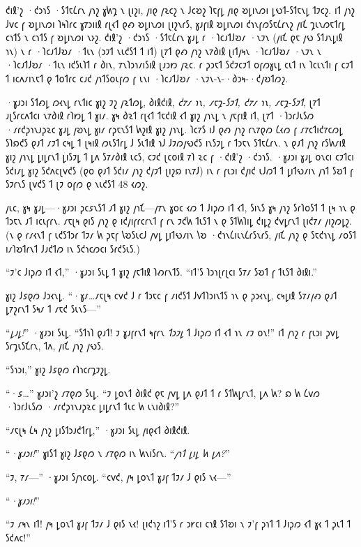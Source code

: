 𐑒𐑦𐑙'𐑟 ·𐑒𐑮𐑪𐑕 ·𐑕𐑑𐑱𐑖𐑩𐑯 𐑢𐑪𐑟 𐑣𐑿𐑡 𐑯 𐑚𐑦𐑟𐑦, 𐑢𐑦𐑞 𐑢𐑷𐑤𐑟 𐑯 𐑓𐑤𐑹𐑟 𐑐𐑱𐑝𐑛 𐑢𐑦𐑞 𐑹𐑛𐑦𐑯𐑼𐑦 𐑛𐑻𐑑-𐑕𐑑𐑱𐑯𐑛 𐑑𐑲𐑤𐑟. 𐑦𐑑 𐑢𐑪𐑟 𐑓𐑫𐑤 𐑝 𐑹𐑛𐑦𐑯𐑼𐑦 𐑐𐑰𐑐𐑩𐑤 𐑣𐑳𐑮𐑦𐑦𐑙 𐑩𐑚𐑬𐑑 𐑞𐑺 𐑹𐑛𐑦𐑯𐑼𐑦 𐑚𐑦𐑟𐑯𐑩𐑕, 𐑣𐑨𐑝𐑦𐑙 𐑹𐑛𐑦𐑯𐑼𐑦 𐑒𐑪𐑯𐑝𐑼𐑕𐑱𐑖𐑩𐑯𐑟 𐑢𐑦𐑗 𐑡𐑧𐑯𐑼𐑱𐑑𐑩𐑛 𐑤𐑪𐑑𐑕 𐑯 𐑤𐑪𐑑𐑕 𐑝 𐑹𐑛𐑦𐑯𐑼𐑦 𐑯𐑶𐑟. 𐑒𐑦𐑙'𐑟 ·𐑒𐑮𐑪𐑕 ·𐑕𐑑𐑱𐑖𐑩𐑯 𐑣𐑨𐑛 𐑩 ·𐑐𐑤𐑨𐑑𐑓𐑹𐑥 ·𐑯𐑲𐑯 (𐑢𐑦𐑗 𐑞𐑱 𐑢𐑻 𐑕𐑑𐑨𐑯𐑛𐑦𐑙 𐑪𐑯) 𐑯 𐑩 ·𐑐𐑤𐑨𐑑𐑓𐑹𐑥 ·𐑑𐑧𐑯 (𐑮𐑲𐑑 𐑯𐑧𐑒𐑕𐑑 𐑑 𐑦𐑑) 𐑚𐑳𐑑 𐑞𐑺 𐑢𐑪𐑟 𐑯𐑳𐑔𐑦𐑙 𐑚𐑦𐑑𐑢𐑰𐑯 ·𐑐𐑤𐑨𐑑𐑓𐑹𐑥 ·𐑯𐑲𐑯 𐑯 ·𐑐𐑤𐑨𐑑𐑓𐑹𐑥 ·𐑑𐑧𐑯 𐑦𐑒𐑕𐑧𐑐𐑑 𐑩 𐑔𐑦𐑯, 𐑳𐑯𐑐𐑮𐑪𐑥𐑦𐑕𐑦𐑙 𐑚𐑨𐑮𐑽 𐑢𐑷𐑤. 𐑩 𐑜𐑮𐑱𐑑 𐑕𐑒𐑲𐑤𐑲𐑑 𐑴𐑝𐑼𐑣𐑧𐑛 𐑤𐑧𐑑 𐑦𐑯 𐑐𐑤𐑧𐑯𐑑𐑦 𐑝 𐑤𐑲𐑑 𐑑 𐑦𐑤𐑵𐑥𐑦𐑯𐑱𐑑 𐑞 𐑑𐑴𐑑𐑩𐑤 𐑤𐑨𐑒 𐑢𐑪𐑑𐑕𐑴𐑧𐑝𐑼 𐑝 𐑧𐑯𐑦 ·𐑐𐑤𐑨𐑑𐑓𐑹𐑥 ·𐑯𐑲𐑯-𐑯-·𐑔𐑮𐑰-·𐑒𐑢𐑹𐑑𐑼𐑟.

·𐑣𐑨𐑮𐑦 𐑕𐑑𐑺𐑛 𐑼𐑬𐑯𐑛 𐑩𐑯𐑑𐑦𐑤 𐑣𐑦𐑟 𐑲𐑟 𐑢𐑷𐑑𐑼𐑛, 𐑔𐑦𐑙𐑒𐑦𐑙, \emph{𐑒𐑳𐑥 𐑪𐑯, 𐑥𐑱𐑡-𐑕𐑲𐑑, 𐑒𐑳𐑥 𐑪𐑯, 𐑥𐑱𐑡-𐑕𐑲𐑑}, 𐑚𐑳𐑑 𐑨𐑚𐑕𐑩𐑤𐑵𐑑𐑤𐑦 𐑯𐑳𐑔𐑦𐑙 𐑩𐑐𐑽𐑛 𐑑 𐑣𐑦𐑥. 𐑣𐑰 𐑔𐑷𐑑 𐑩𐑚𐑬𐑑 𐑑𐑱𐑒𐑦𐑙 𐑬𐑑 𐑣𐑦𐑟 𐑢𐑪𐑯𐑛 𐑯 𐑢𐑱𐑝𐑦𐑙 𐑦𐑑, 𐑚𐑳𐑑 ·𐑐𐑮𐑩𐑓𐑧𐑕𐑼 ·𐑥𐑩𐑒𐑜𐑪𐑯𐑨𐑜𐑷𐑤 𐑣𐑨𐑛 𐑢𐑹𐑯𐑛 𐑣𐑦𐑥 𐑩𐑜𐑱𐑯𐑕𐑑 𐑿𐑟𐑦𐑙 𐑣𐑦𐑟 𐑢𐑪𐑯𐑛. 𐑐𐑤𐑳𐑕 𐑦𐑓 𐑞𐑺 𐑢𐑪𐑟 𐑩𐑯𐑳𐑞𐑼 𐑖𐑬𐑼 𐑝 𐑥𐑳𐑤𐑑𐑦𐑒𐑳𐑤𐑼𐑛 𐑕𐑐𐑸𐑒𐑕 𐑞𐑨𐑑 𐑥𐑲𐑑 𐑤𐑰𐑛 𐑑 𐑚𐑰𐑦𐑙 𐑼𐑧𐑕𐑑𐑩𐑛 𐑓 𐑕𐑧𐑑𐑦𐑙 𐑪𐑓 𐑓𐑲𐑼𐑢𐑻𐑒𐑕 𐑦𐑯𐑕𐑲𐑛 𐑩 𐑑𐑮𐑱𐑯 𐑕𐑑𐑱𐑖𐑩𐑯. 𐑯 𐑞𐑨𐑑 𐑢𐑪𐑟 𐑩𐑕𐑿𐑥𐑦𐑙 𐑣𐑦𐑟 𐑢𐑪𐑯𐑛 𐑛𐑦𐑛𐑩𐑯𐑑 𐑛𐑦𐑕𐑲𐑛 𐑑 𐑛𐑵 𐑕𐑳𐑥𐑔𐑦𐑙 𐑧𐑤𐑕, 𐑤𐑲𐑒 𐑚𐑤𐑴𐑦𐑙 𐑳𐑐 𐑷𐑤 𐑝 ·𐑒𐑦𐑙'𐑟 ·𐑒𐑮𐑪𐑕. ·𐑣𐑨𐑮𐑦 𐑣𐑨𐑛 𐑴𐑯𐑤𐑦 𐑤𐑲𐑑𐑤𐑦 𐑕𐑒𐑦𐑥𐑛 𐑣𐑦𐑟 𐑕𐑒𐑵𐑤𐑚𐑫𐑒𐑕 (𐑞𐑴 𐑞𐑨𐑑 𐑕𐑒𐑦𐑥 𐑢𐑪𐑟 𐑒𐑢𐑲𐑑 𐑚𐑦𐑟𐑸 𐑦𐑯𐑳𐑓) 𐑦𐑯 𐑩 𐑝𐑧𐑮𐑦 𐑒𐑢𐑦𐑒 𐑧𐑓𐑼𐑑 𐑑 𐑛𐑦𐑑𐑻𐑥𐑦𐑯 𐑢𐑪𐑑 𐑕𐑹𐑑 𐑝 𐑕𐑲𐑩𐑯𐑕 𐑚𐑫𐑒𐑕 𐑑 𐑚𐑲 𐑴𐑝𐑼 𐑞 𐑯𐑧𐑒𐑕𐑑 48 𐑬𐑼𐑟.

𐑢𐑧𐑤, 𐑣𐑰 𐑣𐑨𐑛—·𐑣𐑨𐑮𐑦 𐑜𐑤𐑭𐑯𐑕𐑑 𐑨𐑑 𐑣𐑦𐑟 𐑢𐑪𐑗—𐑢𐑳𐑯 𐑣𐑴𐑤 𐑬𐑼 𐑑 𐑓𐑦𐑜𐑼 𐑦𐑑 𐑬𐑑, 𐑕𐑦𐑯𐑕 𐑣𐑰 𐑢𐑪𐑟 𐑕𐑩𐑐𐑴𐑕𐑑 𐑑 𐑚𐑰 𐑪𐑯 𐑞 𐑑𐑮𐑱𐑯 𐑨𐑑 𐑦𐑤𐑧𐑝𐑩𐑯. 𐑥𐑱𐑚𐑰 𐑞𐑦𐑕 𐑢𐑪𐑟 𐑞 𐑦𐑒𐑢𐑦𐑝𐑩𐑤𐑩𐑯𐑑 𐑝 𐑩𐑯 𐑲𐑒𐑿 𐑑𐑧𐑕𐑑 𐑯 𐑞 𐑕𐑑𐑿𐑐𐑦𐑛 𐑒𐑦𐑛𐑟 𐑒𐑫𐑛𐑩𐑯𐑑 𐑚𐑦𐑒𐑳𐑥 𐑢𐑦𐑟𐑼𐑛𐑟. (𐑯 𐑞 𐑩𐑥𐑬𐑯𐑑 𐑝 𐑧𐑒𐑕𐑑𐑮𐑩 𐑑𐑲𐑥 𐑿 𐑜𐑱𐑝 𐑘𐑹𐑕𐑧𐑤𐑓 𐑢𐑫𐑛 𐑛𐑦𐑑𐑻𐑥𐑦𐑯 𐑘𐑹 ·𐑒𐑪𐑯𐑖𐑦𐑧𐑯𐑖𐑩𐑕𐑯𐑩𐑕, 𐑢𐑦𐑗 𐑢𐑪𐑟 𐑞 𐑕𐑱𐑒𐑪𐑯𐑛 𐑥𐑴𐑕𐑑 𐑦𐑥𐑐𐑹𐑑𐑩𐑯𐑑 𐑓𐑨𐑒𐑑𐑼 𐑦𐑯 𐑕𐑒𐑪𐑤𐑼𐑤𐑦 𐑕𐑩𐑒𐑕𐑧𐑕.)

“𐑲'𐑤 𐑓𐑦𐑜𐑼 𐑦𐑑 𐑬𐑑,” ·𐑣𐑨𐑮𐑦 𐑕𐑧𐑛 𐑑 𐑣𐑦𐑟 𐑢𐑱𐑑𐑦𐑙 𐑐𐑺𐑩𐑯𐑑𐑕. “𐑦𐑑'𐑕 𐑐𐑮𐑪𐑚𐑩𐑚𐑤𐑦 𐑕𐑳𐑥 𐑕𐑹𐑑 𐑝 𐑑𐑧𐑕𐑑 𐑔𐑦𐑙𐑦.”

𐑣𐑦𐑟 𐑓𐑭𐑞𐑼 𐑓𐑮𐑬𐑯𐑛. “·𐑣𐑥…𐑥𐑱𐑚𐑰 𐑤𐑫𐑒 𐑓 𐑩 𐑑𐑮𐑱𐑤 𐑝 𐑥𐑦𐑒𐑕𐑑 𐑓𐑫𐑑𐑐𐑮𐑦𐑯𐑑𐑕 𐑪𐑯 𐑞 𐑜𐑮𐑬𐑯𐑛, 𐑤𐑰𐑛𐑦𐑙 𐑕𐑳𐑥𐑢𐑺 𐑞𐑨𐑑 𐑛𐑳𐑟𐑩𐑯𐑑 𐑕𐑰𐑥 𐑑 𐑥𐑱𐑒 𐑕𐑧𐑯𐑕—”

“\emph{𐑛𐑨𐑛!}” ·𐑣𐑨𐑮𐑦 𐑕𐑧𐑛. “𐑕𐑑𐑪𐑐 𐑞𐑨𐑑! 𐑲 𐑣𐑨𐑝𐑩𐑯𐑑 𐑰𐑝𐑩𐑯 \emph{𐑑𐑮𐑲𐑛} 𐑑 𐑓𐑦𐑜𐑼 𐑦𐑑 𐑬𐑑 𐑪𐑯 𐑥𐑲 𐑴𐑯!” 𐑦𐑑 𐑢𐑪𐑟 𐑩 𐑝𐑧𐑮𐑦 𐑜𐑫𐑛 𐑕𐑩𐑡𐑧𐑕𐑗𐑩𐑯, 𐑑𐑵, 𐑢𐑦𐑗 𐑢𐑪𐑟 𐑢𐑻𐑕.

“𐑕𐑪𐑮𐑦,” 𐑣𐑦𐑟 𐑓𐑭𐑞𐑼 𐑩𐑐𐑪𐑤𐑩𐑡𐑲𐑟𐑛.

“·𐑭…” 𐑣𐑨𐑮𐑦'𐑟 𐑥𐑳𐑞𐑼 𐑕𐑧𐑛. “𐑲 𐑛𐑴𐑯𐑑 𐑔𐑦𐑙𐑒 𐑞𐑱 𐑢𐑫𐑛 𐑛𐑵 𐑞𐑨𐑑 𐑑 𐑩 𐑕𐑑𐑿𐑛𐑩𐑯𐑑, 𐑛𐑵 𐑿? 𐑸 𐑿 𐑖𐑫𐑼 ·𐑐𐑮𐑩𐑓𐑧𐑕𐑼 ·𐑥𐑩𐑒𐑜𐑪𐑯𐑨𐑜𐑷𐑤 𐑛𐑦𐑛𐑩𐑯𐑑 𐑑𐑧𐑤 𐑿 𐑧𐑯𐑦𐑔𐑦𐑙?”

“𐑥𐑱𐑚𐑰 𐑖𐑰 𐑢𐑪𐑟 𐑛𐑦𐑕𐑑𐑮𐑨𐑒𐑑𐑩𐑛,” ·𐑣𐑨𐑮𐑦 𐑕𐑧𐑛 𐑢𐑦𐑞𐑬𐑑 𐑔𐑦𐑙𐑒𐑦𐑙.

“\emph{·𐑣𐑨𐑮𐑦!}” 𐑣𐑦𐑕𐑑 𐑣𐑦𐑟 𐑓𐑭𐑞𐑼 𐑯 𐑥𐑳𐑞𐑼 𐑦𐑯 𐑿𐑯𐑦𐑕𐑩𐑯. “\emph{𐑢𐑪𐑑 𐑛𐑦𐑛 𐑿 𐑛𐑵?}”

“𐑲, 𐑳𐑥—” ·𐑣𐑨𐑮𐑦 𐑕𐑢𐑪𐑤𐑴𐑛. “𐑤𐑫𐑒, 𐑢𐑰 𐑛𐑴𐑯𐑑 𐑣𐑨𐑝 𐑑𐑲𐑥 𐑓 𐑞𐑦𐑕 𐑯𐑬—”

“\emph{·𐑣𐑨𐑮𐑦!}”

“𐑲 𐑥𐑰𐑯 𐑦𐑑! 𐑢𐑰 𐑛𐑴𐑯𐑑 𐑣𐑨𐑝 𐑑𐑲𐑥 𐑓 𐑞𐑦𐑕 𐑯𐑬! 𐑚𐑦𐑒𐑪𐑟 𐑦𐑑'𐑕 𐑩 𐑮𐑾𐑤𐑦 𐑤𐑪𐑙 𐑕𐑑𐑹𐑦 𐑯 𐑲'𐑝 𐑜𐑪𐑑 𐑑 𐑓𐑦𐑜𐑼 𐑬𐑑 𐑣𐑬 𐑑 𐑜𐑧𐑑 𐑑 𐑕𐑒𐑵𐑤!”

